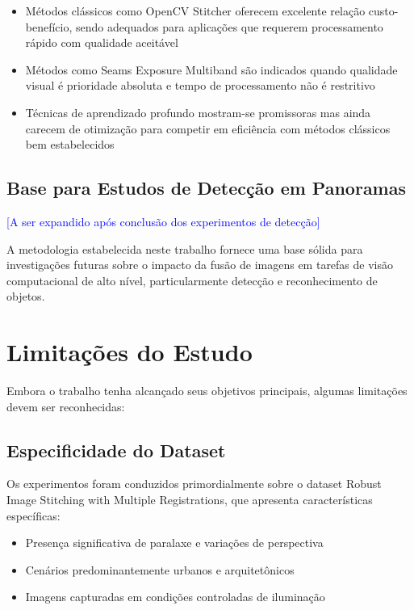 \begin{itemize}
    \item Métodos clássicos como OpenCV Stitcher oferecem excelente relação custo-benefício, sendo adequados para aplicações que requerem processamento rápido com qualidade aceitável

    \item Métodos como Seams Exposure Multiband são indicados quando qualidade visual é prioridade absoluta e tempo de processamento não é restritivo

    \item Técnicas de aprendizado profundo mostram-se promissoras mas ainda carecem de otimização para competir em eficiência com métodos clássicos bem estabelecidos
\end{itemize}

\subsection{Base para Estudos de Detecção em Panoramas}

\textcolor{blue}{[A ser expandido após conclusão dos experimentos de detecção]}

A metodologia estabelecida neste trabalho fornece uma base sólida para investigações futuras sobre o impacto da fusão de imagens em tarefas de visão computacional de alto nível, particularmente detecção e reconhecimento de objetos.

\section{Limitações do Estudo}

Embora o trabalho tenha alcançado seus objetivos principais, algumas limitações devem ser reconhecidas:

\subsection{Especificidade do Dataset}

Os experimentos foram conduzidos primordialmente sobre o dataset Robust Image Stitching with Multiple Registrations, que apresenta características específicas:

\begin{itemize}
    \item Presença significativa de paralaxe e variações de perspectiva
    \item Cenários predominantemente urbanos e arquitetônicos
    \item Imagens capturadas em condições controladas de iluminação
\end{itemize}

